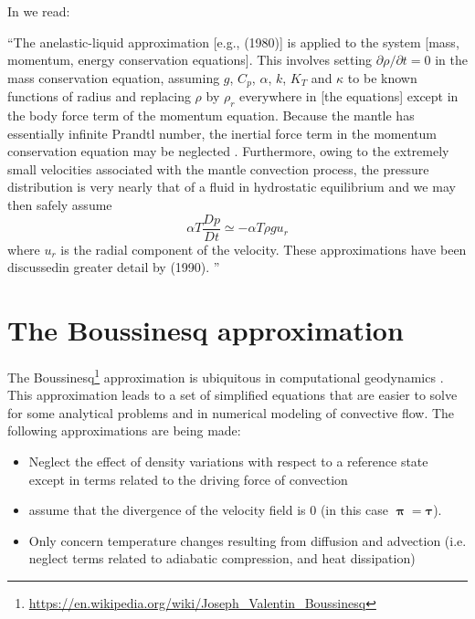In \textcite{sope94} we read: 
\begin{displayquote}
{\color{darkgray}
``The anelastic-liquid approximation [e.g., \textcite{jamc80} (1980)] 
is applied to the system [mass, momentum, energy conservation equations]. 
This involves setting $\partial \rho/\partial t=0$ in the mass conservation equation, 
assuming $g$, $C_p$, $\alpha$, $k$, $K_T$ and $\kappa$
to be known functions of radius and
replacing $\rho$ by $\rho_r$ everywhere in [the equations] except in the body
force term of the momentum equation. Because the mantle has essentially infinite
Prandtl number, the inertial force term in the momentum
conservation equation may be neglected \cite{pelt72}.
Furthermore, owing to the extremely small velocities associated 
with the mantle convection process, the pressure
distribution is very nearly that of a fluid in hydrostatic
equilibrium and we may then safely assume
\[
\alpha T \frac{Dp}{Dt} \simeq -\alpha T \rho g u_r
\]
where $u_r$ is the radial component of the velocity.
These approximations have been discussedin greater detail
by \textcite{sope90} (1990).
'' }
\end{displayquote}



\section{The Boussinesq approximation}

The Boussinesq\footnote{\url{https://en.wikipedia.org/wiki/Joseph_Valentin_Boussinesq}} 
approximation is ubiquitous in computational geodynamics \cite{spve60,yoka04}.
This approximation leads to a set of simplified equations that are easier to solve for some
analytical problems and in numerical modeling of convective flow. The following
approximations are being made:
\begin{itemize}
\item Neglect the effect of density variations with respect to a reference state 
except in terms related to the driving force of convection
\item assume that the divergence of the velocity field is 0 (in this 
case ${\bm \uppi}={\bm \tau}$).
\item Only concern temperature changes resulting from diffusion and advection 
(i.e. neglect terms related to adiabatic compression, and heat dissipation)
\end{itemize}

